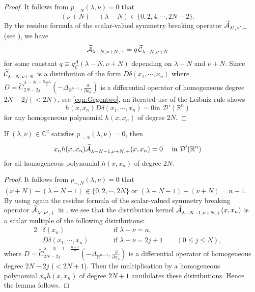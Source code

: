 \begin{proof}
It follows from $p_{+, N}(\lambda, \nu)=0$
 that 
\[
   (\nu+N)-(\lambda-N) \in \{0,2,4,\cdots,2N-2\}.  
\]
By the residue formula
 of the scalar-valued symmetry breaking operator
 $\widetilde{{\mathcal{A}}}_{{\lambda'},{\nu'},{+}}^{{}}$ 
 (see \cite[Thm.~12.2 (2)]{sbon}), 
 we have 
\[
  \widetilde{{\mathcal{A}}}_{{\lambda-N},{\nu+N},{+}}^{{}} = q \, \widetilde{{\mathcal{C}}}_{{\lambda-N},{\nu+N}}^{{}}
\]
 for some constant 
$q\equiv q_C^A(\lambda-N,\nu+N)$
 depending on $\lambda-N$ and $\nu+N$.  
Since $\widetilde{{\mathcal{C}}}_{{\lambda-N},{\nu+N}}^{{}}$ is a distribution
 of the form $D \delta(x_1, \cdots, x_n)$
 where 
$
   D=\widetilde C_{2N-2j}^{\lambda - N - \frac{n-1}{2}}(-\Delta_{\mathbb{R}^{n-1}}, \frac{\partial}{\partial x_n})$ is a differential operator
 of homogeneous degree $2N-2j (< 2N)$, 
 see \eqref{eqn:Gegentwo}, 
 an iterated use of the Leibniz rule shows
\[
   \text{$h(x,x_n)D \delta(x_1, \cdots, x_n)=0$
 in ${\mathcal{D}}'
   ({\mathbb{R}}^n)$}
\]
 for any homogeneous polynomial $h(x,x_n)$
 of degree $2N$.  
\end{proof}

\begin{lemma}
\label{lem:152293-copy}
If $(\lambda,\nu) \in {\mathbb{C}}^2$ satisfies $p_{-,N}(\lambda,\nu)=0$, 
then 
\[
   x_n h(x,x_n) \widetilde{{\mathcal{A}}}_{{\lambda-N-1},{\nu+N},{+}}^{{}} (x,x_n) =0
\quad\text{ in }
{\mathcal{D}}'({\mathbb{R}}^n)
\]
for all homogeneous polynomial $h(x,x_n)$ of degree $2N$.  
\end{lemma}
\begin{proof}
It follows from $p_{-, N}(\lambda, \nu)=0$
 that $(\nu+N)-(\lambda-N-1) \in \{0,2,\cdots,2N\}$
 or $(\lambda-N-1)+(\nu+N) =n-1$.  
By using again the residue formula
 of the scalar-valued symmetry breaking operator
 $\widetilde{{\mathcal{A}}}_{{\lambda'},{\nu'},{+}}^{{}}$
 in \cite[Thm.~12.2]{sbon}, 
 we see that the distribution kernel $\widetilde{{\mathcal{A}}}_{{\lambda-N-1},{\nu+N},{+}}^{{}}(x,x_n)$ is
 a scalar multiple
 of the following distributions:
\begin{alignat*}{2}
& \delta(x_n)
\qquad
&&\text{if } \lambda + \nu=n, 
\\
& D \delta(x_1, \cdots,x_n)
\qquad
&&\text{if } \lambda - \nu =2j+1 \qquad (0 \le j \le N),   
\end{alignat*}
where 
$
    D 
    = 
    {\widetilde C}_{2N-2j}^{\lambda-N-1-\frac{n-1}2}(-\Delta_{\mathbb{R}^{n-1}}, \frac \partial{\partial x_n})
$
 is a differential operator
 of homogeneous degree $2N-2j$
($< 2N+1$).  
Then the multiplication by a homogeneous polynomial $x_n h(x,x_n)$
 of degree $2N+1$
 annihilates these distributions.  
Hence the lemma follows.  
\end{proof}


